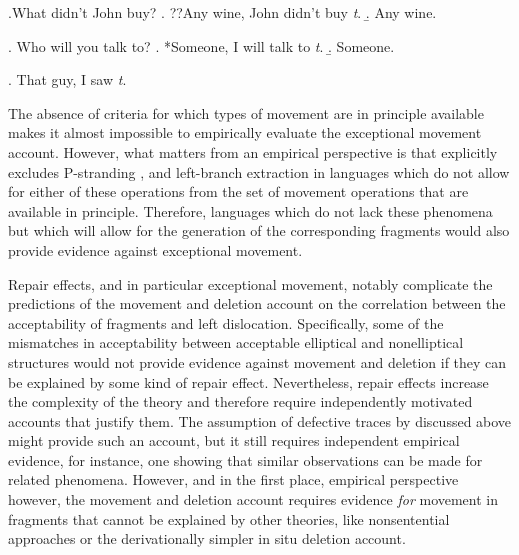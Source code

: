 \ex.What didn't John buy? \hfill \citep[adapted from][3]{weir2015}
\a. ??Any wine, John didn't buy \textit{t}.
\b. Any wine.

\ex. Who will you talk to? \hfill \citep[adapted from][3]{weir2015}
\a. *Someone, I will talk to \textit{t}.
\b. Someone.

\ex. That guy, I saw \textit{t}.  \hfill \citep[10]{weir2015} \label{ex:weir-fronting}

The absence of criteria for which types of movement are in principle available makes it almost impossible to empirically evaluate the exceptional movement account. However, what matters from an empirical perspective is that \citet[11]{weir2015} explicitly excludes P-stranding \citep{pullum.huddleston2002}, and left-branch extraction \citep{ross1967, boskovic2005} in languages which do not allow for either of these operations from the set of movement operations that are available in principle. Therefore, languages which do not lack these phenomena but which will allow for the generation of the corresponding fragments would also provide evidence against exceptional movement.

Repair effects, and in particular exceptional movement, notably complicate the predictions of the movement and deletion account on the correlation between the acceptability of fragments and left dislocation. Specifically, some of the mismatches in acceptability between acceptable elliptical and nonelliptical structures would not provide evidence against movement and deletion if they can be explained by some kind of repair effect. Nevertheless, repair effects increase the complexity of the theory and therefore require independently motivated accounts that justify them. The assumption of defective traces by \citet{merchant2004} discussed above might provide such an account, but it still requires independent empirical evidence, for instance, one showing that similar observations can be made for related phenomena. However, and in the first place, empirical perspective however, the movement and deletion account requires evidence \textit{for} movement in fragments that cannot be explained by other theories, like nonsentential approaches or the derivationally simpler in situ deletion account.

